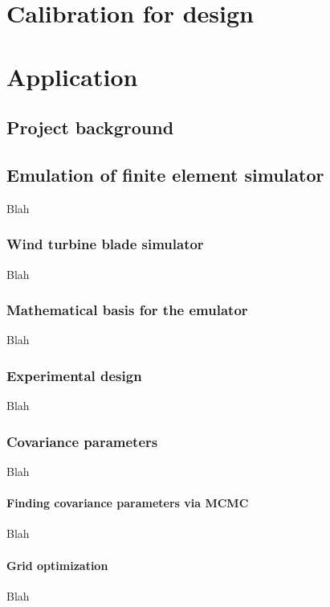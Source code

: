 \documentclass{article}
\begin{document}
\section{Calibration for design}



\section{Application}

\subsection{Project background}

\subsection{Emulation of finite element simulator}
Blah

\subsubsection{Wind turbine blade simulator}
Blah

\subsubsection{Mathematical basis for the emulator}
Blah

\subsubsection{Experimental design}
Blah

\subsubsection{Covariance parameters}
Blah

\paragraph{Finding covariance parameters via MCMC}
Blah

\paragraph{Grid optimization}
Blah
\end{document}

